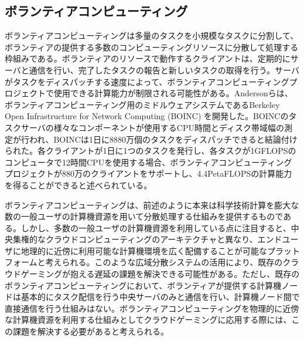 \subsection{ボランティアコンピューティング}
ボランティアコンピューティングは多量のタスクを小規模なタスクに分割して、ボランティアの提供する多数のコンピューティングリソースに分散して処理する枠組みである。ボランティアのリソースで動作するクライアントは、定期的にサーバと通信を行い、完了したタスクの報告と新しいタスクの取得を行う。サーバがタスクをディスパッチする速度によって、ボランティアコンピューティングプロジェクトで使用できる計算能力が制限される可能性がある。Andersonら\cite{boinc}は、ボランティアコンピューティング用のミドルウェアシステムであるBerkeley Open Infrastructure for Network Computing (BOINC) を開発した。BOINCのタスクサーバの様々なコンポーネントが使用するCPU時間とディスク帯域幅の測定が行われ、BOINCは1日に8880万個のタスクをディスパッチできると結論付けられた。各クライアントが1日に1つのタスクを発行し、各タスクが1GFLOPSのコンピュータで12時間CPUを使用する場合、ボランティアコンピューティングプロジェクトが880万のクライアントをサポートし、4.4PetaFLOPSの計算能力を得ることができると述べられている。

ボランティアコンピューティングは、前述のように本来は科学技術計算を膨大な数の一般ユーザの計算機資源を用いて分散処理する仕組みを提供するものである。しかし、多数の一般ユーザの計算機資源を利用している点に注目すると、中央集権的なクラウドコンピューティングのアーキテクチャと異なり、エンドユーザに地理的に近傍に利用可能な計算機環境を広く配備することが可能なプラットフォームと考えられる。このような広域分散システムの活用により、既存のクラウドゲーミングが抱える遅延の課題を解決できる可能性がある。ただし、既存のボランティアコンピューティングにおいて、ボランティアが提供する計算機ノードは基本的にタスク配信を行う中央サーバのみと通信を行い、計算機ノード間で直接通信を行う仕組みはない。ボランティアコンピューティングを物理的に近傍な計算機資源を利用する仕組みとしてクラウドゲーミングに応用する際には、この課題を解決する必要があると考えられる。
